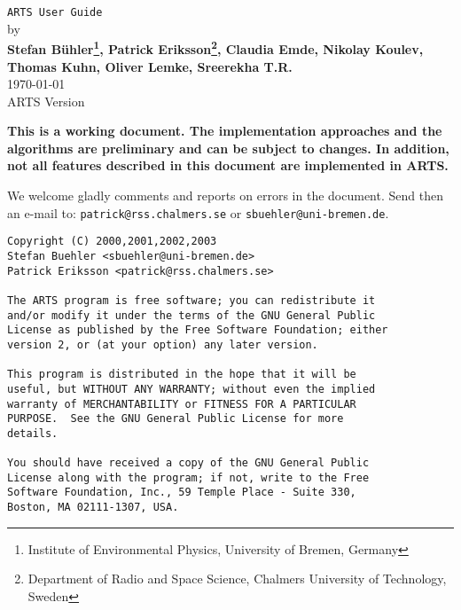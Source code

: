 







%
%
\renewcommand{\thepage}{title \arabic{page}} 

\thispagestyle{plain}
\begin{center}
  \vspace*{2cm}
  {\Huge \verb|ARTS User Guide|\\}
  \vspace*{1cm}
  {\large by \\}
  \vspace*{1cm}
  {\large \bf Stefan B\"uhler\footnote{Institute of Environmental
      Physics, University of Bremen, Germany},  Patrick Eriksson\footnote{Department of
    Radio and Space Science, Chalmers University of Technology, Sweden}, 
   Claudia Emde\footnotemark[1], Nikolay Koulev\footnotemark[1], 
   Thomas Kuhn\footnotemark[1], Oliver Lemke\footnotemark[1], 
   Sreerekha T.R.\footnotemark[1] }\\
   \vspace*{2cm}
   {\large \today\\
    ARTS Version 
   }
\end{center}
  \vspace*{4cm}
{\normalsize \bf
  \noindent
  This is a working document. The implementation approaches and the
  algorithms are preliminary and can be subject to changes. In addition,
  not all features described in this document are implemented in ARTS.
  
  We welcome gladly comments and reports on errors in the document.
  Send then an e-mail to: \verb|patrick@rss.chalmers.se| or 
  \verb|sbuehler@uni-bremen.de|.
}

\newpage                          
\thispagestyle{empty}
\vspace*{\fill}
\noindent
\begin{verbatim}
Copyright (C) 2000,2001,2002,2003 
Stefan Buehler <sbuehler@uni-bremen.de>
Patrick Eriksson <patrick@rss.chalmers.se>

The ARTS program is free software; you can redistribute it
and/or modify it under the terms of the GNU General Public
License as published by the Free Software Foundation; either
version 2, or (at your option) any later version.

This program is distributed in the hope that it will be
useful, but WITHOUT ANY WARRANTY; without even the implied
warranty of MERCHANTABILITY or FITNESS FOR A PARTICULAR
PURPOSE.  See the GNU General Public License for more
details. 

You should have received a copy of the GNU General Public
License along with the program; if not, write to the Free
Software Foundation, Inc., 59 Temple Place - Suite 330,
Boston, MA 02111-1307, USA. 
\end{verbatim}
\cleardoublepage

